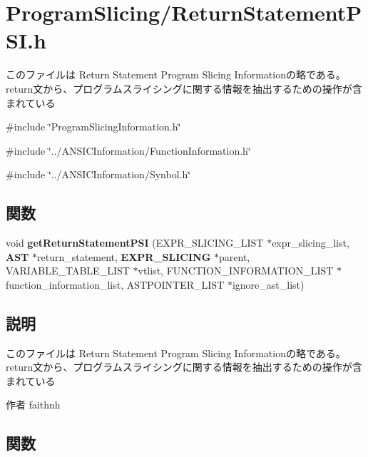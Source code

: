 \section{ProgramSlicing/ReturnStatementPSI.h}
\label{_return_statement_p_s_i_8h}


このファイルは Return Statement Program Slicing Informationの略である。 return文から、プログラムスライシングに関する情報を抽出するための操作が含まれている  


{\ttfamily \#include \char`\"{}ProgramSlicingInformation.h\char`\"{}}\par
{\ttfamily \#include \char`\"{}../ANSICInformation/FunctionInformation.h\char`\"{}}\par
{\ttfamily \#include \char`\"{}../ANSICInformation/Synbol.h\char`\"{}}\par
\subsection*{関数}
\begin{DoxyCompactItemize}
\item 
void {\bf getReturnStatementPSI} (EXPR\_\-SLICING\_\-LIST $\ast$expr\_\-slicing\_\-list, {\bf AST} $\ast$return\_\-statement, {\bf EXPR\_\-SLICING} $\ast$parent, VARIABLE\_\-TABLE\_\-LIST $\ast$vtlist, FUNCTION\_\-INFORMATION\_\-LIST $\ast$function\_\-information\_\-list, ASTPOINTER\_\-LIST $\ast$ignore\_\-ast\_\-list)
\end{DoxyCompactItemize}


\subsection{説明}
このファイルは Return Statement Program Slicing Informationの略である。 return文から、プログラムスライシングに関する情報を抽出するための操作が含まれている \begin{DoxyAuthor}{作者}
faithnh 
\end{DoxyAuthor}


\subsection{関数}
